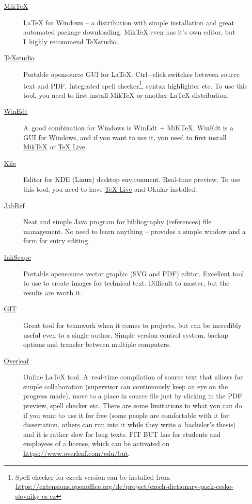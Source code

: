 \begin{description}
	\item[\href{http://miktex.org/download}{MikTeX}] \LaTeX{} for Windows -- a distribution with simple installation and great automated package downloading. MikTeX even has it's own editor, but I~highly recommend TeXstudio.
	\item[\href{http://texstudio.sourceforge.net/}{TeXstudio}] Portable opensource GUI for \LaTeX{}. Ctrl+click switches between source text and PDF. Integrated spell checker\footnote{Spell checker for czech version can be installed from \url{https://extensions.openoffice.org/de/project/czech-dictionary-pack-ceske-slovniky-cs-cz}}, syntax highlighter etc. To use this tool, you need to first install MikTeX or another \LaTeX{} distribution.
    \item[\href{http://www.winedt.com/}{WinEdt}] A~good combination for Windows is WinEdt + MiKTeX. WinEdt is a GUI for Windows, and if you want to use it, you need to first install \href{http://miktex.org/download}{MikTeX} or \href{http://www.tug.org/texlive/}{TeX Live}.
    \item[\href{http://kile.sourceforge.net/}{Kile}] Editor for KDE (Linux) desktop environment. Real-time preview. To use this tool, you need to have \href{http://www.tug.org/texlive/}{TeX Live} and Okular installed.
	\item[\href{http://jabref.sourceforge.net/download.php}{JabRef}] Neat and simple Java program for bibliography (references) file management. No need to learn anything -- provides a simple window and a form for entry editing.
	\item[\href{https://inkscape.org/en/download/}{InkScape}] Portable opensource vector graphic (SVG and PDF) editor. Excellent tool to use to create images for technical text. Difficult to master, but the results are worth it.
	\item[\href{https://git-scm.com/}{GIT}] Great tool for teamwork when it comes to projects, but can be incredibly useful even to a single author. Simple version control system, backup options and transfer between multiple computers.
	\item[\href{http://www.overleaf.com/}{Overleaf}] Online \LaTeX{} tool. A~real-time compilation of source text that allows for simple collaboration (supervisor can continuously keep an eye on the progress made), move to a place in source file just by clicking in the PDF preview, spell checker etc. There are some limitations to what you can do if you want to use it for free (some people are comfortable with it for dissertation, others can run into it while they write a~bachelor's thesis) and it is rather slow for long texts. FIT BUT has for students and employees of a license, which can be activated on \url{https://www.overleaf.com/edu/but}.
\end{description}

